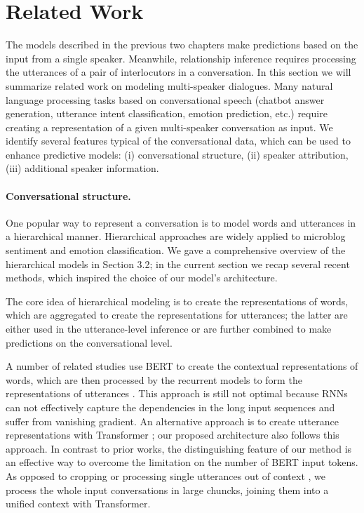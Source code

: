 \section{Related Work}

The models described in the previous two chapters make predictions based on the input from a single speaker. Meanwhile, relationship inference requires processing the utterances of a pair of interlocutors in a conversation.
In this section we will summarize related work on modeling multi-speaker dialogues. Many natural language processing tasks based on conversational speech (chatbot answer generation, utterance intent classification, emotion prediction, etc.) require creating a representation of a given multi-speaker conversation as input.
We identify several features typical of the conversational data, which can be used to enhance predictive models: (i) conversational structure, (ii) speaker attribution, (iii) additional speaker information. 

\paragraph{Conversational structure.} 
One popular way to represent a conversation is to model words and utterances in a hierarchical manner. Hierarchical approaches are widely applied to microblog sentiment and emotion classification. We gave a comprehensive overview of the hierarchical models in Section 3.2; in the current section we recap several recent methods, which inspired the choice of our model's architecture.

The core idea of hierarchical modeling is to create the representations of words, which are aggregated to create the representations for utterances; the latter are either used in the utterance-level inference or are further combined to make predictions on the conversational level. 

A number of related studies use BERT to create the contextual representations of words, which are then processed by the recurrent models to form the representations of utterances \cite{lei2019bert, ma2020han}. This approach is still not optimal because RNNs can not effectively capture the dependencies in the long input sequences and suffer from vanishing gradient. An alternative approach is to create utterance representations with Transformer \cite{shan2020contextual, li2020hierarchical}; our proposed architecture also follows this approach. In contrast to prior works, the distinguishing feature of our method is an effective way to overcome the limitation on the number of BERT input tokens. As opposed to cropping or processing single utterances out of context \cite{li2020hierarchical, shan2020contextual}, we process the whole input conversations in large chuncks, joining them into a unified context with Transformer.


